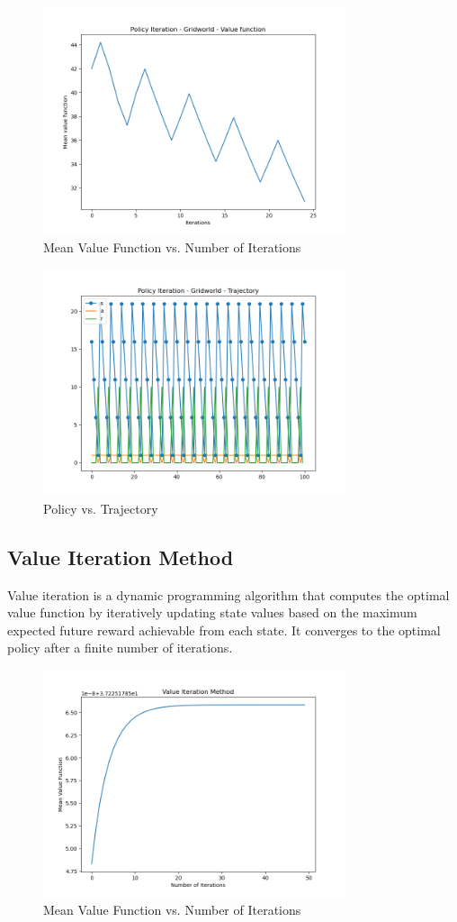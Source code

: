 \documentclass[conference]{IEEEtran}
\begin{document}
\begin{figure}[!htbp]
\centerline{\includegraphics[width=3.5in]{g_pi_valfn_vs_iter.png}}
\caption{Mean Value Function vs. Number of Iterations}
\label{fig}
\end{figure}
\FloatBarrier

\begin{figure}[!htbp]
\centerline{\includegraphics[width=3.5in]{g_pi_policy_vs_trajec.png}}
\caption{Policy vs. Trajectory}
\label{fig}
\end{figure}
\FloatBarrier

\subsection{Value Iteration Method}

Value iteration is a dynamic programming algorithm that computes the optimal value function by iteratively updating state values based on the maximum expected future reward achievable from each state. It converges to the optimal policy after a finite number of iterations. \cite{b1}

\begin{figure}[!htbp]
\centerline{\includegraphics[width=3.5in]{g_vi_valfn_vs_iter.png}}
\caption{Mean Value Function vs. Number of Iterations}
\label{fig}
\end{figure}
\FloatBarrier
\end{document}
